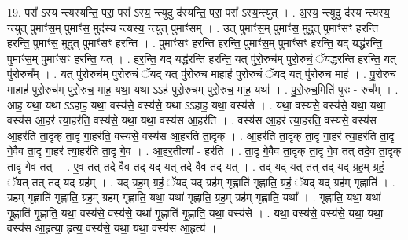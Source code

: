 \documentclass[17pt]{extarticle}
\begin{document}
19. परा᳚ ऽस्य न्त्यस्यन्ति॒ परा॒ परा᳚ ऽस्य॒ न्त्युदु द॑स्यन्ति॒ परा॒ परा᳚ ऽस्य॒न्त्युत् । . अ॒स्य॒ न्त्युदु द॑स्य न्त्यस्य॒ न्त्युत् पुमाꣳ॑स॒म् पुमाꣳ॑स॒ मुद॑स्य न्त्यस्य॒ न्त्युत् पुमाꣳ॑सम् । . उत् पुमाꣳ॑स॒म् पुमाꣳ॑स॒ मुदुत् पुमाꣳ॑सꣳ हरन्ति हरन्ति॒ पुमाꣳ॑स॒ मुदुत् पुमाꣳ॑सꣳ हरन्ति । . पुमाꣳ॑सꣳ हरन्ति हरन्ति॒ पुमाꣳ॑स॒म् पुमाꣳ॑सꣳ हरन्ति॒ यद् यद्ध॑रन्ति॒ पुमाꣳ॑स॒म् पुमाꣳ॑सꣳ हरन्ति॒ यत् । . ह॒र॒न्ति॒ यद् यद्ध॑रन्ति हरन्ति॒ यत् पु॑रो॒रुच॑म् पुरो॒रुचं॒ ॅयद्ध॑रन्ति हरन्ति॒ यत् पु॑रो॒रुच᳚म् । . यत् पु॑रो॒रुच॑म् पुरो॒रुचं॒ ॅयद् यत् पु॑रो॒रुच॒ माहाह॑ पुरो॒रुचं॒ ॅयद् यत् पु॑रो॒रुच॒ माह॑ । . पु॒रो॒रुच॒ माहाह॑ पुरो॒रुच॑म् पुरो॒रुच॒ माह॒ यथा॒ यथा ऽऽह॑ पुरो॒रुच॑म् पुरो॒रुच॒ माह॒ यथा᳚ । . पु॒रो॒रुच॒मिति॑ पुरः - रुच᳚म् । . आह॒ यथा॒ यथा ऽऽहाह॒ यथा॒ वस्य॑से॒ वस्य॑से॒ यथा ऽऽहाह॒ यथा॒ वस्य॑से । . यथा॒ वस्य॑से॒ वस्य॑से॒ यथा॒ यथा॒ वस्य॑स आ॒हर॑ त्या॒हर॑ति॒ वस्य॑से॒ यथा॒ यथा॒ वस्य॑स आ॒हर॑ति । . वस्य॑स आ॒हर॑ त्या॒हर॑ति॒ वस्य॑से॒ वस्य॑स आ॒हर॑ति ता॒दृक् ता॒दृ गा॒हर॑ति॒ वस्य॑से॒ वस्य॑स आ॒हर॑ति ता॒दृक् । . आ॒हर॑ति ता॒दृक् ता॒दृ गा॒हर॑ त्या॒हर॑ति ता॒दृ गे॒वैव ता॒दृ गा॒हर॑ त्या॒हर॑ति ता॒दृ गे॒व । . आ॒हर॒तीत्या᳚ - हर॑ति । . ता॒दृ गे॒वैव ता॒दृक् ता॒दृ गे॒व तत् तदे॒व ता॒दृक् ता॒दृ गे॒व तत् । . ए॒व तत् तदे॒ वैव तद् यद् यत् तदे॒ वैव तद् यत् । . तद् यद् यत् तत् तद् यद् ग्रह॒म् ग्रहं॒ ॅयत् तत् तद् यद् ग्रह᳚म् । . यद् ग्रह॒म् ग्रहं॒ ॅयद् यद् ग्रह॑म् गृ॒ह्णाति॑ गृ॒ह्णाति॒ ग्रहं॒ ॅयद् यद् ग्रह॑म् गृ॒ह्णाति॑ । . ग्रह॑म् गृ॒ह्णाति॑ गृ॒ह्णाति॒ ग्रह॒म् ग्रह॑म् गृ॒ह्णाति॒ यथा॒ यथा॑ गृ॒ह्णाति॒ ग्रह॒म् ग्रह॑म् गृ॒ह्णाति॒ यथा᳚ । . गृ॒ह्णाति॒ यथा॒ यथा॑ गृ॒ह्णाति॑ गृ॒ह्णाति॒ यथा॒ वस्य॑से॒ वस्य॑से॒ यथा॑ गृ॒ह्णाति॑ गृ॒ह्णाति॒ यथा॒ वस्य॑से । . यथा॒ वस्य॑से॒ वस्य॑से॒ यथा॒ यथा॒ वस्य॑स आ॒हृत्या॒ हृत्य॒ वस्य॑से॒ यथा॒ यथा॒ वस्य॑स आ॒हृत्य॑ । \newline
\end{document}
